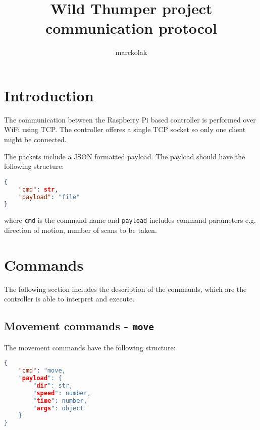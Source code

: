 \documentclass[11pt,a4paper]{article}
\author{marckolak}
\title{Wild Thumper project communication protocol}
\begin{document}
\maketitle

\section{Introduction}
The communication between the Raspberry Pi based controller is performed over WiFi using TCP. The controller offeres a single TCP socket so only one client might be connected.

The packets include a JSON formatted payload. The payload should have the following structure:
\vspace{6pt}
\begin{lstlisting}[language=json,firstnumber=1]
{
	"cmd": str,
  	"payload": "file"
}
\end{lstlisting}
where \texttt{cmd} is the command name and \texttt{payload} includes command parameters e.g. direction of motion, number of scans to be taken.

\section{Commands}
The following section includes the description of the commands, which are the controller is able to interpret and execute.

\subsection{Movement commands - \texttt{move}}
The movement commands have the following structure:
\vspace{6pt}
\begin{lstlisting}[language=json,firstnumber=1]
{
	"cmd": "move,
  	"payload": {
		"dir": str,
		"speed": number,
		"time": number,
		"args": object
  	}
}
\end{lstlisting}
\end{document}
